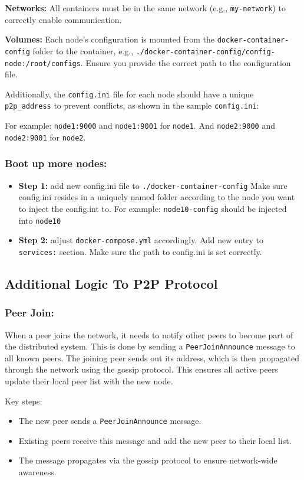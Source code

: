 \textbf{Networks:} All containers must be in the same network (e.g., \texttt{my-network}) to correctly enable communication.

\textbf{Volumes:} Each node's configuration is mounted from the \texttt{docker-container-config} folder to the container, e.g., \texttt{./docker-container-config/config-node:/root/configs}. Ensure you provide the correct path to the configuration file.

Additionally, the \texttt{config.ini} file for each node should have a unique \texttt{p2p\_address} to prevent conflicts, as shown in the sample \texttt{config.ini}:

For example: \texttt{node1:9000} and \texttt{node1:9001} for \texttt{node1}. And \texttt{node2:9000} and \texttt{node2:9001} for \texttt{node2}.

\subsubsection{Boot up more nodes:}
  \begin{itemize}
    \item \textbf{Step 1:} add new config.ini file to \texttt{./docker-container-config} Make sure config.ini resides in a uniquely named folder according to the node you want to inject the config.int to. For example: \texttt{node10-config} should be injected into \texttt{node10}
    \item \textbf{Step 2:} adjust \texttt{docker-compose.yml} accordingly. Add new entry to \texttt{services:} section. Make sure the path to config.ini is set correctly.
  \end{itemize}
  
  
\subsection{Additional Logic To P2P Protocol}

\subsubsection{Peer Join:}
When a peer joins the network, it needs to notify other peers to become part of the distributed system. This is done by sending a \texttt{PeerJoinAnnounce} message to all known peers. The joining peer sends out its address, which is then propagated through the network using the gossip protocol. This ensures all active peers update their local peer list with the new node.

Key steps:
\begin{itemize}
    \item The new peer sends a \texttt{PeerJoinAnnounce} message.
    \item Existing peers receive this message and add the new peer to their local list.
    \item The message propagates via the gossip protocol to ensure network-wide awareness.
\end{itemize}

